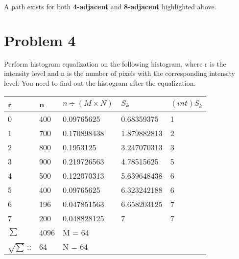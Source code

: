 \documentclass[12pt]{article}
\begin{document}
             A path exists for both \textbf{4-adjacent} and \textbf{8-adjacent} highlighted above.
    \section{Problem 4}
    Perform histogram equalization on the following histogram, where r is the intensity level 
    and n is the number of pixels with the corresponding intensity level. You need to find out
     the histogram after the equalization.
        \begin{tabular}{ | l | l | l | l | l | }
            \hline
            r & n & ${n} \div (M \times N)$ & $S_k$ & $(int) S_k$\\\hline    
            0 & 400 & 0.09765625 & 0.68359375 & 1\\\hline
            1 & 700 & 0.170898438 & 1.879882813 & 2\\\hline
            2 & 800 & 0.1953125 & 3.247070313 & 3\\\hline
            3 & 900 & 0.219726563 & 4.78515625 & 5\\\hline
            4 & 500 & 0.122070313 & 5.639648438 & 6\\\hline
            5 & 400 & 0.09765625 & 6.323242188 & 6\\\hline
            6 & 196 & 0.047851563 & 6.658203125 & 7\\\hline
            7 & 200 & 0.048828125 & 7 & 7\\\hline
            \hline        
            $\sum$  & 4096 & M = 64 & & \\\hline
            $\sqrt{\sum}$ :: & 64  & N = 64 & &\\\hline
        \end{tabular}
    \newpage
\end{document}
